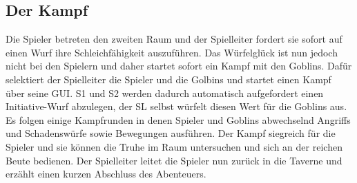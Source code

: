 \subsection{Der Kampf}
\label{sec:DerKampf}
Die Spieler betreten den zweiten Raum und der Spielleiter fordert sie sofort auf einen Wurf ihre Schleichfähigkeit auszuführen. Das Würfelglück ist nun jedoch nicht bei den Spielern und daher startet sofort ein Kampf mit den Goblins.\newline
Dafür selektiert der Spielleiter die Spieler und die Golbins und startet einen Kampf über seine GUI. S1 und S2 werden dadurch automatisch aufgefordert einen Initiative-Wurf abzulegen, der SL selbst würfelt diesen Wert für die Goblins aus. Es folgen einige Kampfrunden in denen Spieler und Goblins abwechselnd Angriffs und Schadenswürfe sowie Bewegungen ausführen.\newline
Der Kampf siegreich für die Spieler und sie können die Truhe im Raum untersuchen und sich an der reichen Beute bedienen. Der Spielleiter leitet die Spieler nun zurück in die Taverne und erzählt einen kurzen Abschluss des Abenteuers.


